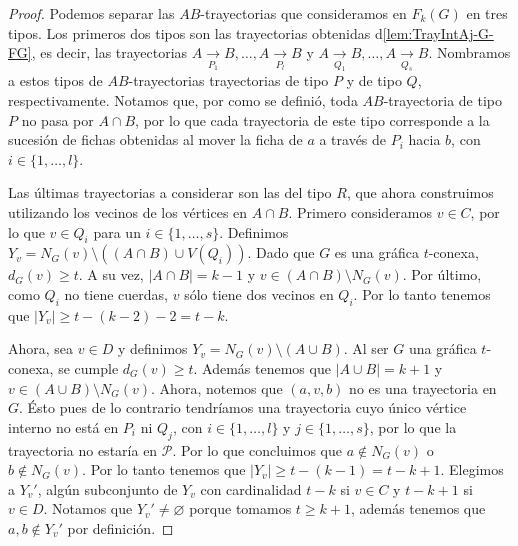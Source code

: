 \begin{proof}
    Podemos separar las $AB$-trayectorias que consideramos en $F_{k}(G)$ en tres
    tipos. Los primeros dos tipos son las trayectorias obtenidas
    d\cref{lem:TrayIntAj-G-FG}, es decir, las trayectorias $A
    \xrightarrow[P_1]{}  B, \dots, A \xrightarrow[P_l]{}  B$ y $A
    \xrightarrow[Q_1]{}  B, \dots, A \xrightarrow[Q_s]{}  B$. Nombramos a estos
    tipos de $AB$-trayectorias trayectorias de tipo $P$ y de tipo $Q$,
    respectivamente. Notamos que, por como se defini\'o, toda $AB$-trayectoria
    de tipo $P$ no pasa por $A\cap B$, por lo que cada trayectoria de este tipo
    corresponde a la sucesi\'on de fichas obtenidas al mover la ficha de $a$ a
    trav\'es de $P_i$ hacia $b$, con $i \in \{1, \dots, l\}$.
    
    Las \'ultimas trayectorias a considerar son las del tipo $R$, que ahora
    construimos utilizando los vecinos de los v\'ertices en $A \cap B$. Primero
    consideramos $v \in C$, por lo que $v \in Q_i$ para un  $i \in \{1, \dots,
    s\}$. Definimos $Y_v = N_G(v) \setminus ((A \cap B) \cup V(Q_i))$. Dado que
    $G$ es una gr\'afica $t$-conexa, $d_G(v) \geq t$. A su vez, $|A \cap B| =k
    -1$ y $v \in (A \cap B) \setminus N_G(v)$. Por \'ultimo, como $Q_i$ no tiene
    cuerdas, $v$ s\'olo tiene dos vecinos en $Q_i$. Por lo tanto tenemos que
    $|Y_v| \geq t- (k-2)-2 = t-k$. 
    
    Ahora, sea $v \in D$ y definimos $Y_v = N_G(v) \setminus (A \cup B)$. Al ser
    $G$ una gr\'afica $t$-conexa, se cumple $d_G(v) \geq t$. Adem\'as tenemos
    que $|A \cup B| = k + 1$ y $v \in (A \cup B) \setminus N_G(v)$. Ahora,
    notemos que $(a, v, b)$ no es una trayectoria en $G$. \'Esto pues de lo
    contrario tendr\'iamos una trayectoria cuyo \'unico v\'ertice interno no
    est\'a en $P_i$ ni $Q_j$, con $i \in \{1, \dots, l\}$ y $j \in
    \{1, \dots, s\}$, por lo que la trayectoria no estar\'ia en $\mathcal{P}$.
    Por lo que concluimos que $a \notin N_G(v)$ o $b \notin N_G(v)$. Por lo
    tanto tenemos que $|Y_v| \geq t- (k-1) = t-k + 1$. Elegimos a $Y_v '$,
    alg\'un subconjunto de $Y_v$ con cardinalidad $t-k$ si $v \in C$ y $t- k+ 1$
    si $v \in D$. Notamos que $Y_v ' \neq \varnothing$ porque tomamos $t \geq k
    + 1$, adem\'as tenemos que $a, b \notin Y_v '$ por definici\'on. 


\end{proof}
